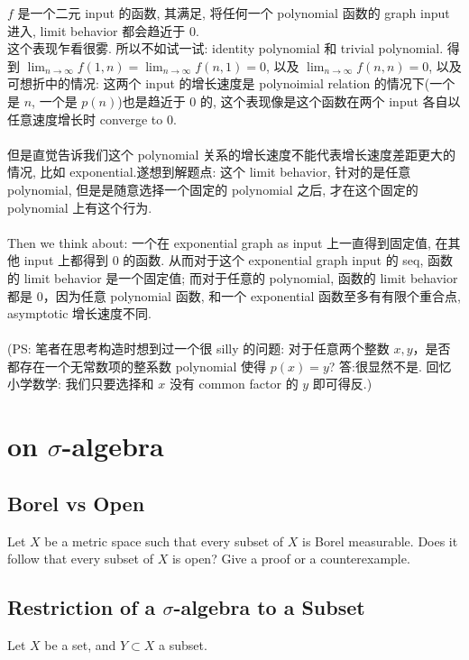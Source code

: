 \documentclass[lang=cn,11pt]{elegantbook}
\begin{document}
\begin{remark}
    $f$ 是一个二元 input 的函数, 其满足, 将任何一个 polynomial 函数的 graph input 进入, limit behavior 都会趋近于 0.\\ 这个表现乍看很雾. 所以不如试一试: identity polynomial 和 trivial polynomial. 得到 $\lim_{n \rightarrow \infty} f(1,n) = \lim_{n \rightarrow \infty} f(n,1) = 0$, 以及 $\lim_{n \rightarrow \infty} f(n,n) = 0$, 以及可想折中的情况: 这两个 input 的增长速度是 polynoimial relation 的情况下(一个是 $n$, 一个是 $p(n)$)也是趋近于 0 的, 这个表现像是这个函数在两个 input 各自以任意速度增长时 converge to 0.\\\\
    但是直觉告诉我们这个 polynomial 关系的增长速度不能代表增长速度差距更大的情况, 比如 exponential.遂想到解题点: 这个 limit behavior, 针对的是任意 polynomial, 但是是随意选择一个固定的 polynomial 之后, 才在这个固定的 polynomial 上有这个行为.\\\\
    Then we think about: 一个在 exponential graph as input 上一直得到固定值, 在其他 input 上都得到 0 的函数. 从而对于这个 exponential graph input 的 seq, 函数的 limit behavior 是一个固定值; 而对于任意的 polynomial, 函数的 limit behavior 都是 0，因为任意 polynomial 函数, 和一个 exponential 函数至多有有限个重合点, asymptotic 增长速度不同.\\\\
    (PS: 笔者在思考构造时想到过一个很 silly 的问题: 对于任意两个整数 $x,y$，是否都存在一个无常数项的整系数 polynomial 使得 $p(x) = y$? 答:很显然不是. 回忆小学数学: 我们只要选择和 $x$ 没有 common factor 的 $y$ 即可得反.)
\end{remark}





\chapter{on $\sigma$-algebra}

\section{Borel vs Open}
Let $X$ be a metric space such that every subset of $X$ is Borel measurable. Does it follow that every subset of $X$ is open? Give a proof or a counterexample.

\section{Restriction of a $\sigma$-algebra to a Subset}
Let $X$ be a set, and $Y \subset X$ a subset.
\end{document}

